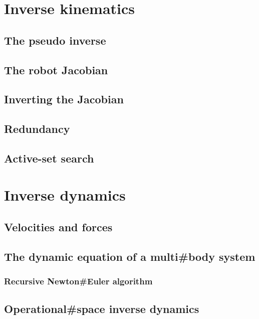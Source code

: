 \documentclass{book}
\begin{document}
\chapter{Inverse kinematics}

\section{The pseudo inverse}

\section{The robot Jacobian}

\section{Inverting the Jacobian}

\section{Redundancy}

\section{Active-set search}

\chapter{Inverse dynamics}

\section{Velocities and forces}

\section{The dynamic equation of a multi#body system}

\subsection{Recursive Newton#Euler algorithm}

\section{Operational#space inverse dynamics}
\end{document}
